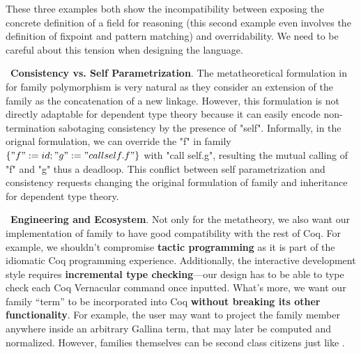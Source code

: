 These three examples both show the incompatibility between exposing the
concrete definition of a field for reasoning (this second example even
involves the definition of fixpoint and pattern matching) and
overridability. We need to be careful about this tension when designing
the language.

~\textbf{Consistency vs. Self Parametrization}.
The meta\-theoretical formulation in~\citet{zm2017} for family
polymorphism is very natural as they consider an extension of the family
as the concatenation of a new linkage. However, this formulation is not
directly adaptable for dependent type theory because it can easily
encode non-termination sabotaging consistency by the presence of "self".
Informally, in the orignal formulation, we can override the "f" in
family $\{"f" := id; "g" := "call self.f"\}$ with "call self.g",
resulting the mutual calling of "f" and "g" thus a deadloop. This
conflict between self parametrization and consistency requests changing
the original formulation of family and inheritance for dependent type
theory.


~\textbf{Engineering and Ecosystem}.
Not only for the metatheory, we also want our implementation of family
to have good compatibility with the rest of Coq. For example, we
shouldn't compromise \textbf{tactic programming} as it is part of the
idiomatic Coq programming experience. Additionally, the interactive development
style requires \textbf{incremental type checking}---our design has to be
able to type check each Coq Vernacular command once inputted. What's
more, we want our family ``term'' to be incorporated into Coq \textbf{without
breaking its other functionality}. For example, the user may want to
project the family member anywhere inside an arbitrary Gallina term,
that may later be computed and normalized. However, families themselves
can be second class citizens just like \citet{zm2017}.


